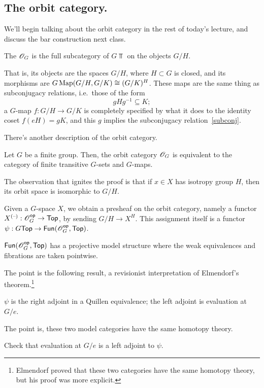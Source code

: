 \subsection*{The orbit category.}
We'll begin talking about the orbit category in the rest of today's lecture, and discuss the bar construction next
class.
\begin{defn}
The  $\mathscr O_G$ is the full subcategory of $G\Top$ on the objects $G/H$.
\end{defn}
That is, its objects are the spaces $G/H$, where $H\subset G$ is closed, and its morphisms are $G\operatorname{Map}(G/H,
G/K)\cong (G/K)^H$. These maps are the same thing as subconjugacy relations, i.e.\ those of the form
\begin{equation}
\label{subconj}
gHg^{-1}\subseteq K;
\end{equation}
a $G$-map $f:G/H\to G/K$ is completely specified by what it does to the identity coset $f(eH) = gK$, and this $g$
implies the subconjugacy relation~\eqref{subconj}.

There's another description of the orbit category.
\begin{prop}
Let $G$ be a finite group. Then, the orbit category $\mathscr O_G$ is equivalent to the category of finite transitive
$G$-sets and $G$-maps.
\end{prop}
The observation that ignites the proof is that if $x\in X$ has isotropy group $H$, then its orbit space is
isomorphic to $G/H$.
\begin{defn}
Given a $G$-space $X$, we obtain a presheaf on the orbit category, namely a functor $X^{(\text{--})}:\mathscr O_G^{\mathsf{op}}\to\mathsf{Top}$, by
sending $G/H\to X^H$. This assignment itself is a functor $\psi:G\mathsf{Top}\to\mathsf{Fun}(\mathscr O_G^{\mathsf{op}}, \mathsf{Top})$.
\end{defn}
\begin{prop}
$\mathsf{Fun}(\mathscr O_G^{\mathsf{op}}, \mathsf{Top})$ has a projective model structure where the weak equivalences and fibrations are taken
pointwise.
\end{prop}
The point is the following result, a revisionist interpretation of Elmendorf's theorem.\footnote{Elmendorf proved
that these two categories have the same homotopy theory, but his proof was more explicit.}
\begin{thm}
$\psi$ is the right adjoint in a Quillen equivalence; the left adjoint is evaluation at $G/e$.
\end{thm}
The point is, these two model categories have the same homotopy theory.
\begin{ex}
Check that evaluation at $G/e$ is a left adjoint to $\psi$.
\end{ex}
